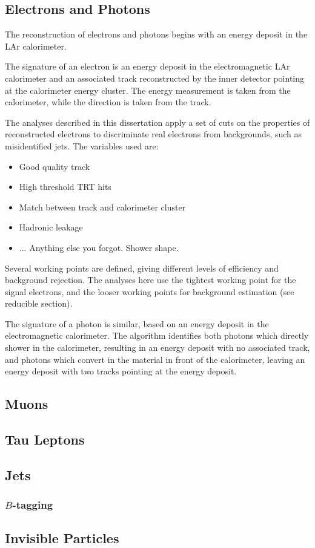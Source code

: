 \subsection{Electrons and Photons}\label{sec:event-reconstruction-electrons}
The reconstruction of electrons and photons begins with an energy deposit in the LAr calorimeter. 

The signature of an electron is an energy deposit in the electromagnetic LAr calorimeter and an associated track reconstructed by the inner detector pointing at the calorimeter energy cluster. The energy measurement is taken from the calorimeter, while the direction is taken from the track.

The analyses described in this dissertation apply a set of cuts on the properties of reconstructed electrons to discriminate real electrons from backgrounds, such as misidentified jets. The variables used are:
\begin{itemize}
	\item Good quality track
	\item High threshold TRT hits
	\item Match between track and calorimeter cluster
	\item Hadronic leakage
	\item ... Anything else you forgot. Shower shape.
\end{itemize}

Several working points are defined, giving different levels of efficiency and background rejection. The analyses here use the tightest working point for the signal electrons, and the looser working points for background estimation (see reducible section).

The signature of a photon is similar, based on an energy deposit in the electromagnetic calorimeter. The algorithm identifies both photons which directly shower in the calorimeter, resulting in an energy deposit with no associated track,  and photons which convert in the material in front of the calorimeter, leaving an energy deposit with two tracks pointing at the energy deposit.



\subsection{Muons}\label{sec:event-reconstruction-muons}

\subsection{Tau Leptons}\label{sec:event-reconstruction-taus}

\subsection{Jets}\label{sec:event-reconstruction-jets}

\subsubsection{$B$-tagging}\label{sec:event-reconstruction-bjets}

\subsection{Invisible Particles}\label{sec:event-reconstruction-met}
